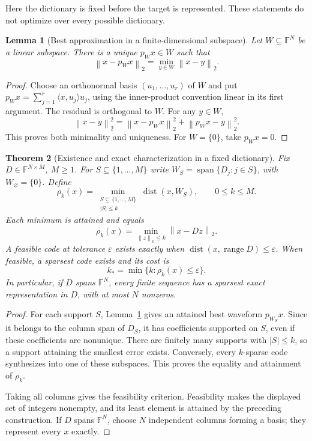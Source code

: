 \documentclass[11pt,a4paper]{article}
\newtheorem{theorem}{Theorem}
\newtheorem{lemma}[theorem]{Lemma}
\theoremstyle{definition}
\theoremstyle{remark}
\newcommand{\F}{\mathbb F}
\newcommand{\spanof}{\operatorname{span}}
\newcommand{\dist}{\operatorname{dist}}
\newcommand{\norm}[1]{\left\lVert#1\right\rVert}
\begin{document}
Here the dictionary is fixed before the target is represented. These statements
do not optimize over every possible dictionary.

\begin{lemma}[Best approximation in a finite-dimensional subspace]\label{lem:projection}
Let $W\subseteq\F^N$ be a linear subspace. There is a unique $p_Wx\in W$ such that
\[
\norm{x-p_Wx}_2=\min_{y\in W}\norm{x-y}_2.
\]
\end{lemma}
\begin{proof}
Choose an orthonormal basis $(u_1,\ldots,u_r)$ of $W$ and put
$p_Wx=\sum_{j=1}^r\langle x,u_j\rangle u_j$, using the inner-product convention
linear in its first argument. The residual is orthogonal to $W$. For any $y\in W$,
\[
\norm{x-y}_2^2=\norm{x-p_Wx}_2^2+\norm{p_Wx-y}_2^2.
\]
This proves both minimality and uniqueness. For $W=\{0\}$, take $p_Wx=0$.
\end{proof}

\begin{theorem}[Existence and exact characterization in a fixed dictionary]\label{thm:dictionary}
Fix $D\in\F^{N\times M}$, $M\geq1$. For $S\subseteq\{1,\ldots,M\}$ write
$W_S=\spanof\{D_j:j\in S\}$, with $W_\varnothing=\{0\}$. Define
\[
\rho_k(x)=\min_{\substack{S\subseteq\{1,\ldots,M\}\\|S|\leq k}}
              \dist(x,W_S),\qquad 0\leq k\leq M .
\]
Each minimum is attained and equals
\[
\rho_k(x)=\min_{\norm{z}_0\leq k}\norm{x-Dz}_2.
\]
A feasible code at tolerance $\varepsilon$ exists exactly when
$\dist(x,\operatorname{range}D)\leq\varepsilon$. When feasible, a sparsest code
exists and its cost is
\[
k_*=\min\{k:\rho_k(x)\leq\varepsilon\}.
\]
In particular, if $D$ spans $\F^N$, every finite sequence has a sparsest exact
representation in $D$, with at most $N$ nonzeros.
\end{theorem}
\begin{proof}
For each support $S$, Lemma~\ref{lem:projection} gives an attained best waveform
$p_{W_S}x$. Since it belongs to the column span of $D_S$, it has coefficients
supported on $S$, even if these coefficients are nonunique. There are finitely
many supports with $|S|\leq k$, so a support attaining the smallest error exists.
Conversely, every $k$-sparse code synthesizes into one of these subspaces. This
proves the equality and attainment of $\rho_k$.

Taking all columns gives the feasibility criterion. Feasibility makes the
displayed set of integers nonempty, and its least element is attained by the
preceding construction. If $D$ spans $\F^N$, choose $N$ independent columns
forming a basis; they represent every $x$ exactly.
\end{proof}
\end{document}

